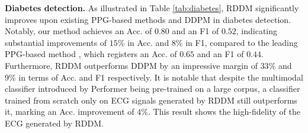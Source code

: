 \documentclass[letterpaper]{article} %
\begin{document}
    \begin{table}[t]
    \centering
    \small
    \setlength{\tabcolsep}{3pt}
    \caption{Evaluation of \textbf{Stress and Affect detection} on WESAD dataset. RDDM not only outperforms prior works, also achieves a very close performance to the upper bound.}
    \label{table:wesad}
    \end{table}
     
\noindent\textbf{Diabetes detection.} As illustrated in Table \ref{tab:diabetes}, RDDM significantly improves upon existing PPG-based methods and DDPM in diabetes detection. Notably, our method achieves an Acc. of $0.80$ and an F1 of $0.52$, indicating substantial improvements of $15\%$ in Acc. and $8\%$ in F1, compared to the leading PPG-based method \cite{avram2020digital}, which registers an Acc. of $0.65$ and an F1 of $0.44$. Furthermore, RDDM outperforms DDPM by an impressive margin of $33\%$ and $9\%$ in terms of Acc. and F1 respectively. It is notable that despite the multimodal classifier introduced by Performer \cite{lan2023performer} being pre-trained on a large corpus, a classifier trained from scratch only on ECG signals generated by RDDM still outperforms it, marking an Acc. improvement of $4\%$. This result shows the high-fidelity of the ECG generated by RDDM.
\end{document}
